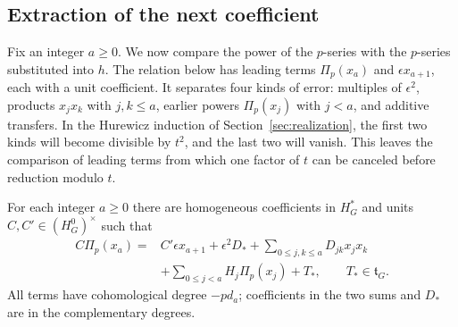 \subsection{Extraction of the next coefficient}

Fix an integer $a\geq0$. We now compare the power of the $p$-series
with the $p$-series substituted into $h$. The relation below has leading terms
$\Pi_p(x_a)$ and $\epsilon x_{a+1}$, each with a unit coefficient.
It separates four kinds of error: multiples of $\epsilon^2$,
products $x_jx_k$ with $j,k\leq a$, earlier powers $\Pi_p(x_j)$
with $j<a$, and additive transfers. In the Hurewicz induction of
Section~\ref{sec:realization}, the first two kinds will become
divisible by $t^2$, and the last two will vanish. This leaves the
comparison of leading terms from which one factor of $t$ can be
canceled before reduction modulo $t$.

\begin{proposition}
 \label{cob:coefficient-relation}
 For each integer $a\geq 0$ there are homogeneous coefficients in
 $H_G^*$ and units $C,C'\in(H_G^0)^\times$ such that
 \begin{equation}
  \label{eq:cobordism}
  \begin{split}
   C\Pi_p(x_a)={}&C'\epsilon x_{a+1}+\epsilon^2D_*
      +\sum_{0\leq j,k\leq a}D_{jk}x_jx_k\\
      &+\sum_{0\leq j<a}H_j\Pi_p(x_j)+T_*,
      \qquad T_*\in\mathfrak t_G.
  \end{split}
 \end{equation}
 All terms have cohomological degree $-p d_a$; coefficients in the
 two sums and $D_*$ are in the complementary degrees.
\end{proposition}

